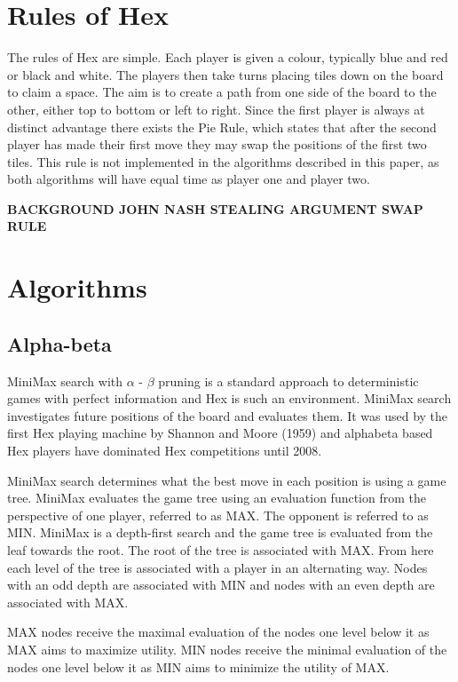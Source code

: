 \documentclass{ba-kecs}
\begin{document}
\section{Rules of Hex}
The rules of Hex are simple. Each player is given a colour, typically blue and red or black and white. The players then take turns placing tiles down on the board to claim a space. The aim is to create a path from one side of the board to the other, either top to bottom or left to right. Since the first player is always at distinct advantage there exists the Pie Rule, which states that after the second player has made their first move they may swap the positions of the first two tiles. This rule is not implemented in the algorithms described in this paper, as both algorithms will have equal time as player one and player two.

\textbf{BACKGROUND JOHN NASH STEALING ARGUMENT SWAP RULE} \cite{nash1952}

\section{Algorithms}
\subsection{Alpha-beta}
MiniMax search with $\alpha$ - $\beta$ pruning is a standard approach to deterministic games with perfect information and Hex is such an environment. MiniMax search investigates future positions of the board and evaluates them. It was used by the first Hex playing machine by Shannon and Moore (1959) and alphabeta based Hex players have dominated Hex competitions until 2008.\cite{arneson2010monte} 

MiniMax search determines what the best move in each position is using a game tree. MiniMax evaluates the game tree using an evaluation function from the perspective of one player, referred to as MAX. The opponent is referred to as MIN. \cite{russell1995modern} MiniMax is a depth-first search and the game tree is evaluated from the leaf towards the root. The root of the tree is associated with MAX. From here each level of the tree is associated with a player in an alternating way. Nodes with an odd depth are associated with MIN and nodes with an even depth are associated with MAX. 

MAX nodes receive the maximal evaluation of the nodes one level below it as MAX aims to maximize utility. MIN nodes receive the minimal evaluation of the nodes one level below it as MIN aims to minimize the utility of MAX. \cite{russell1995modern}
\end{document}

